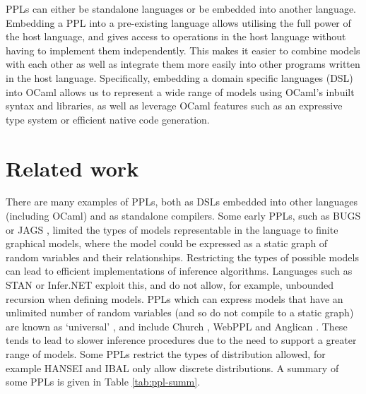 PPLs can either be standalone languages or be embedded into another language. Embedding a PPL into a pre-existing language allows utilising the full power of the host language, and gives access to operations in the host language without having to implement them independently. This makes it easier to combine models with each other as well as integrate them more easily into other programs written in the host language. Specifically, embedding a domain specific languages (DSL) into OCaml allows us to represent a wide range of models using OCaml's inbuilt syntax and libraries, as well as leverage OCaml features such as an expressive type system or efficient native code generation.

\section{Related work}
There are many examples of PPLs, both as DSLs embedded into other languages (including OCaml) and as standalone compilers. Some early PPLs, such as BUGS \cite{gilks1994bugs} or JAGS \cite{plummer2004jags}, limited the types of models representable in the language to finite graphical models, where the model could be expressed as a static graph of random variables and their relationships. Restricting the types of possible models can lead to efficient implementations of inference algorithms. Languages such as STAN \cite{carpenter2017stan} or Infer.NET \cite{wang2011using} exploit this, and do not allow, for example, unbounded recursion when defining models. PPLs which can express models that have an unlimited number of random variables (and so do not compile to a static graph) are known as `universal' \cite{borgstrom2016lambda}, and include Church \cite{goodman2012church}, WebPPL \cite{mobus2018structure} and Anglican \cite{anglican-smc}. These tends to lead to slower inference procedures due to the need to support a greater range of models. Some PPLs restrict the types of distribution allowed, for example HANSEI \cite{kiselyov2009embedded} and IBAL \cite{ibal} only allow discrete distributions. A summary of some PPLs is given in Table \ref{tab:ppl-summ}.

